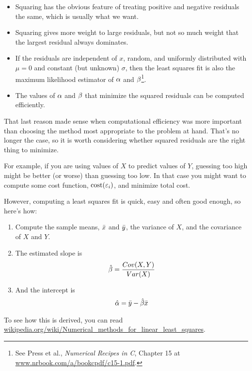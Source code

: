 \documentclass[12pt]{book}
\begin{document}
\begin{itemize}

\item Squaring has the obvious feature of treating positive and
negative residuals the same, which is usually what we want.

\item Squaring gives more weight to large residuals, but not
so much weight that the largest residual always dominates.

\item If the residuals are independent of $x$, random, and uniformly
  distributed with $\mu=0$ and constant (but unknown) $\sigma$, then
  the least squares fit is also the maximum likelihood estimator of
  $\alpha$ and $\beta$\footnote{See Press et al., {\em Numerical Recipes in C},
    Chapter 15 at \url{www.nrbook.com/a/bookcpdf/c15-1.pdf}.}.

\item The values of $\alpha$ and $\beta$ that minimize the squared
  residuals can be computed efficiently.

\end{itemize}

That last reason made sense when computational efficiency was more
important than choosing the method most appropriate to the problem
at hand.  That's no longer the case, so it is worth considering
whether squared residuals are the right thing to minimize.

For example, if you are using values of $X$ to predict values of $Y$,
guessing too high might be better (or worse) than guessing too low.
In that case you might want to compute some cost function,
$\mathrm{cost}(\varepsilon_i)$, and minimize total cost.

However, computing a least squares fit is quick, easy and often good
enough, so here's how:

\begin{enumerate}

\item Compute the sample means, $\bar{x}$ and $\bar{y}$, the variance
of $X$, and the covariance of $X$ and $Y$.

\item The estimated slope is
%
\[ \hat{\beta} = \frac{Cov(X,Y)}{Var(X)} \]
%
\item And the intercept is
%
\[ \hat{\alpha} = \bar{y} - \hat{\beta} \bar{x} \]
%
\end{enumerate}

To see how this is derived, you can read
\url{wikipedia.org/wiki/Numerical_methods_for_linear_least_squares}.
\end{document}

